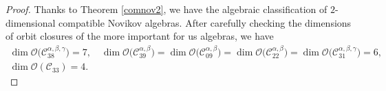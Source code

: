 \documentclass[pdftex]{sigma}
\numberwithin{equation}{section}
\begin{document}
\begin{proof}
 Thanks to Theorem \ref{comnov2}, we have the algebraic classification of
 $2$-dimensional compatible Novikov algebras.
After carefully checking the dimensions of orbit closures of the more important for us algebras, we have
\begin{gather*}
\dim \mathcal{O}\bigl(\mathcal{C}_{38}^{\alpha,\beta,\gamma}\bigr)=7, \quad
\dim \mathcal{O}\bigl(\mathcal{C}_{39}^{\alpha,\beta}\bigr)=
\dim \mathcal{O}\bigl(\mathcal{C}_{09}^{\alpha,\beta}\bigr)=
\dim \mathcal{O}\bigl(\mathcal{C}_{22}^{\alpha,\beta}\bigr)=
\dim \mathcal{O}\bigl(\mathcal{C}_{31}^{\alpha,\beta,\gamma}\bigr)=6, \\
\dim \mathcal{O}(\mathcal{C}_{33})=4.
\end{gather*}






\end{proof}
\end{document}
